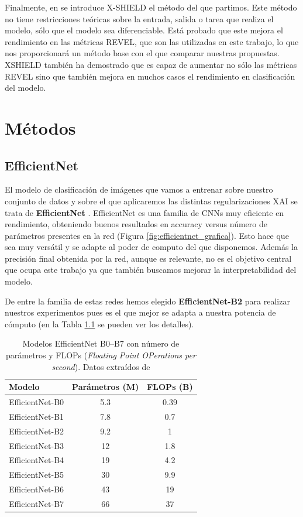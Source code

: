 Finalmente, en \cite{XSHIELD} se introduce X-SHIELD el método del que partimos. Este método no tiene restricciones teóricas sobre la entrada, salida o tarea que realiza el modelo, sólo que el modelo sea diferenciable. Está probado que este mejora el rendimiento en las métricas REVEL, que son las utilizadas en este trabajo, lo que nos proporcionará un método base con el que comparar nuestras propuestas. XSHIELD también ha demostrado que es capaz de aumentar no sólo las métricas REVEL sino que también mejora en muchos casos el rendimiento en clasificación del modelo.


\newpage
\chapter{Métodos} \label{cap:met}

\section{EfficientNet}

El modelo de clasificación de imágenes que vamos a entrenar sobre nuestro conjunto de datos y sobre el que aplicaremos las distintas regularizaciones XAI se trata de \textbf{EfficientNet} \cite{efficientnet2019}. EfficientNet es una familia de CNNs muy eficiente en rendimiento, obteniendo buenos resultados en accuracy versus número de parámetros presentes en la red (Figura \ref{fig:efficientnet_grafica}). Esto hace que sea muy versátil y se adapte al poder de computo del que disponemos. Además la precisión final obtenida por la red, aunque es relevante, no es el objetivo central que ocupa este trabajo ya que también buscamos mejorar la interpretabilidad del modelo.

De entre la familia de estas redes hemos elegido \textbf{EfficientNet-B2} para realizar nuestros experimentos pues es el que mejor se adapta a nuestra potencia de cómputo (en la Tabla \ref{tab:EfficientNet_Params} se pueden ver los detalles).

\begin{table}[h!]
\centering
\begin{tabular}{lcc}
\hline
\textbf{Modelo} & \textbf{Parámetros (M)} & \textbf{FLOPs (B)} \\
\hline
EfficientNet-B0 & 5.3  & 0.39 \\
EfficientNet-B1 & 7.8  & 0.7 \\
EfficientNet-B2 & 9.2  & 1 \\
EfficientNet-B3 & 12   & 1.8 \\
EfficientNet-B4 & 19   & 4.2 \\
EfficientNet-B5 & 30   & 9.9 \\
EfficientNet-B6 & 43   & 19 \\
EfficientNet-B7 & 66   & 37 \\
\hline
\end{tabular}
\caption{Modelos EfficientNet B0--B7 con número de parámetros y FLOPs (\textit{Floating Point OPerations per second}). Datos extraídos de \cite{efficientnet2019}}
\label{tab:EfficientNet_Params}
\end{table}

